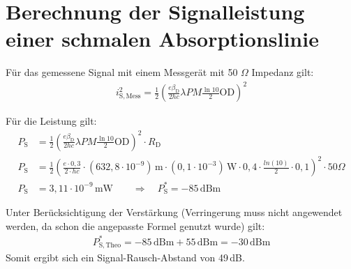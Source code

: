 
\section{Berechnung der Signalleistung einer schmalen Absorptionslinie}
\label{sec:signalAbsorp}

Für das gemessene Signal mit einem Messgerät mit 50 $\Omega$ Impedanz gilt:
\begin{gather}
    i_\mathrm{S,Mess}^2 = \frac{1}{2}(\frac{e\beta_\mathrm{D}}{2hc}\lambda P M \frac{\ln10}{2}\mathrm{OD})^2
\end{gather}

Für die Leistung gilt:
\begin{align}
    \label{eq:leistungPhotosignal}
    P_\mathrm{S} &= \frac{1}{2}(\frac{e\beta_\mathrm{D}}{2hc}\lambda P M \frac{\ln10}{2}\mathrm{OD})^2 \cdot R_\mathrm{D}\\
    P_\mathrm{S} &= \frac{1}{2} ( \frac{e\cdot 0,3}{2\cdot h c} \cdot (632,8 \cdot 10^{-9}) \, \mathrm{m} \cdot (0,1 \cdot 10^{-3}) \, \mathrm{W} \cdot 0,4 \cdot \frac{ln(10)}{2} \cdot 0,1)^2 \cdot 50 \Omega \\
    P_\mathrm{S} &= 3,11 \cdot 10^{-9}\,\mathrm{mW} \qquad \Rightarrow \quad P_\mathrm{S}^* = -85 \, \mathrm{dBm}
\end{align}

Unter Berücksichtigung der Verstärkung (Verringerung muss nicht angewendet werden, da schon die angepasste Formel genutzt wurde) gilt:
\begin{gather}
    P_\mathrm{S,Theo}^* = -85 \, \text{dBm} + 55 \, \text{dBm} = -30 \, \text{dBm}
\end{gather}
Somit ergibt sich ein Signal-Rausch-Abstand von 49\,dB.